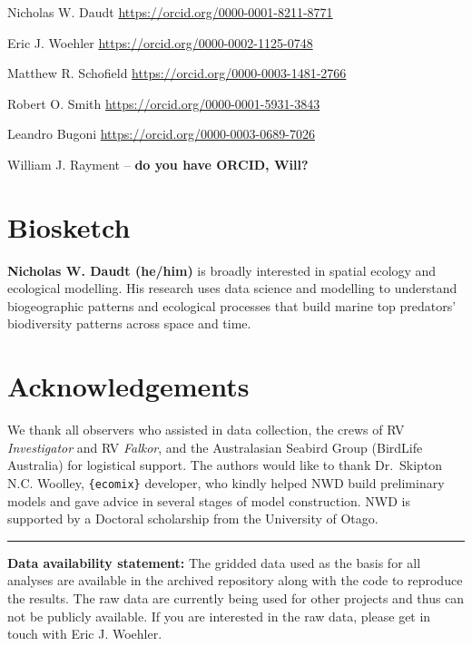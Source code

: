 \documentclass{article}
\begin{document}
Nicholas W. Daudt \url{https://orcid.org/0000-0001-8211-8771}

Eric J. Woehler \url{https://orcid.org/0000-0002-1125-0748}

Matthew R. Schofield \url{https://orcid.org/0000-0003-1481-2766}

Robert O. Smith \url{https://orcid.org/0000-0001-5931-3843}

Leandro Bugoni \url{https://orcid.org/0000-0003-0689-7026}

William J. Rayment -- \textbf{do you have ORCID, Will?}

\hypertarget{biosketch}{%
\section*{Biosketch}\label{biosketch}}

\textbf{Nicholas W. Daudt (he/him)} is broadly interested in spatial ecology and ecological modelling. His research uses data science and modelling to understand biogeographic patterns and ecological processes that build marine top predators' biodiversity patterns across space and time.

\hypertarget{acknowledgements}{%
\section*{Acknowledgements}\label{acknowledgements}}

We thank all observers who assisted in data collection, the crews of RV \emph{Investigator} and RV \emph{Falkor}, and the Australasian Seabird Group (BirdLife Australia) for logistical support. The authors would like to thank Dr.~Skipton N.C. Woolley, \texttt{\{ecomix\}} developer, who kindly helped NWD build preliminary models and gave advice in several stages of model construction. NWD is supported by a Doctoral scholarship from the University of Otago.

\begin{center}\rule{0.5\linewidth}{0.5pt}\end{center}

\textbf{Data availability statement:} The gridded data used as the basis for all analyses are available in the archived repository along with the code to reproduce the results. The raw data are currently being used for other projects and thus can not be publicly available. If you are interested in the raw data, please get in touch with Eric J. Woehler.
\end{document}
